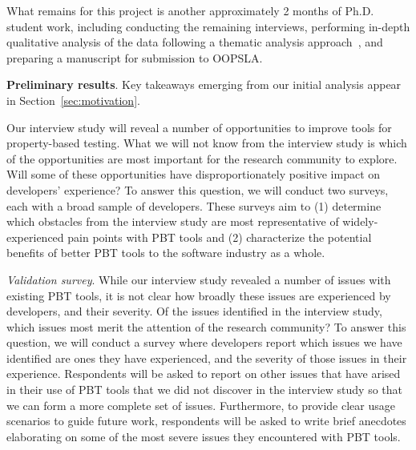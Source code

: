 What remains for this project is another approximately 2 months of Ph.D.
student work, including conducting the remaining interviews, performing
in-depth qualitative analysis of the data following a thematic analysis
approach~\cite[Chapter 5]{blandford2016qualitative}, and preparing a manuscript
for submission to OOPSLA.

\textbf{Preliminary results}. Key takeaways emerging from our initial analysis
appear in Section~\ref{sec:motivation}.

\label{sec:survey}


Our interview study will reveal a number of opportunities to
improve tools for property-based testing. What we will not
know from the interview study is which of the opportunities
are most important for the research community to explore. Will
some of these opportunities have disproportionately positive
impact on developers' experience? To answer this question,
we will conduct two surveys, each with a broad sample of
developers. These surveys aim to (1) determine which
obstacles from the interview study are most representative
of widely-experienced pain points with PBT tools and
(2) characterize the potential benefits of better PBT tools
to the software industry as a whole.

\emph{Validation survey}. While our interview study revealed
a number of issues with existing PBT tools, it is not clear
how broadly these issues are experienced by developers, and
their severity. Of the issues identified in the interview
study, which issues most merit the attention of the research
community? To answer this question, we will conduct a survey
where developers report which issues we have identified are
ones they have experienced, and the severity of those issues
in their experience. Respondents will be asked to report on
other issues that have arised in their use of PBT tools that
we did not discover in the interview study so that we can
form a more complete set of issues. Furthermore, to provide
clear usage scenarios to guide future work, respondents will
be asked to write brief anecdotes elaborating on some of the
most severe issues they encountered with PBT tools.

